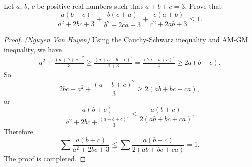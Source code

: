 \documentclass[12pt,a4paper]{book}
\begin{document}
\begin{pro_no_count}
Let $a, \,b,\,c$ be positive real numbers such that $a+b+c=3.$ Prove that
$$\dfrac{a(b+c)}{a^2+2bc+3} + \dfrac{b(c+a)}{b^2+2ca+3} + \dfrac{c(a+b)}{c^2+2ab+3} \le 1.$$
\end{pro_no_count}

\begin{proof}
\textit{(Nguyen Van Huyen)} Using the Cauchy-Schwarz inequality and AM-GM inequality, we have
$$\begin{aligned}
a^2+\frac{(a+b+c)^2}{3} \geqslant \frac{(a+a+b+c)^2}{1+3}  = \frac{(2a+b+c)^2}{4} \geqslant 2a(b+c).
\end{aligned}$$
So
$$2bc+a^2+\frac{(a+b+c)^2}{3} \geqslant 2(ab+bc+ca),$$
or
$$\frac{a(b+c)}{a^2+2bc+\frac{(a+b+c)^2}{3}} \leq \frac{a(b+c)}{2(ab+bc+ca)}.$$
Therefore
$$\sum \frac{a(b+c)}{a^2+2bc+3} \leq \sum \frac{a(b+c)}{2(ab+bc+ca)} =1.$$
The proof is completed.
\end{proof}
\end{document}
